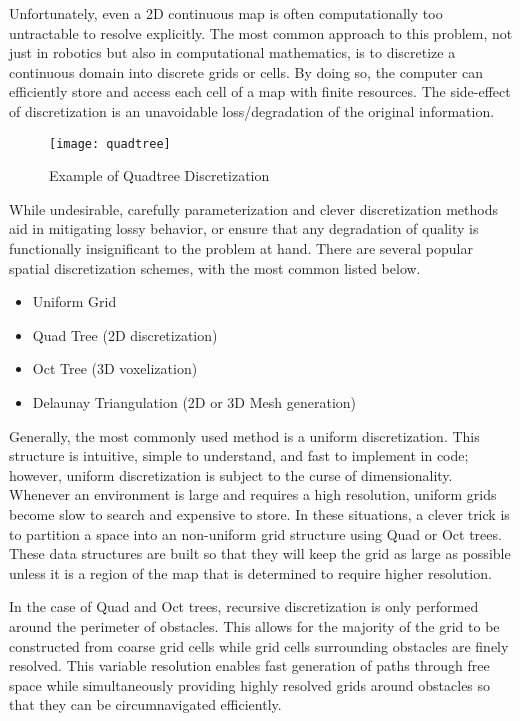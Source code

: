 Unfortunately, even a 2D continuous map is often computationally too untractable to resolve explicitly. The most common approach to this problem, not just in robotics but also in computational mathematics, is to discretize a continuous domain into discrete grids or cells. By doing so, the computer can efficiently store and access each cell of a map with finite resources. The side-effect of discretization is an unavoidable loss/degradation of the original information.

\begin{figure}[ht]
  \texttt{[image: quadtree]}
  \centering
  \label{fig:quadtree}
  \caption{Example of Quadtree Discretization}
\end{figure}

While undesirable, carefully parameterization and clever discretization methods aid in mitigating lossy behavior, or ensure that any degradation of quality is functionally insignificant to the problem at hand. There are several popular spatial discretization schemes, with the most common listed below. 

\begin{itemize}
  \item Uniform Grid
  \item Quad Tree (2D discretization)
  \item Oct Tree (3D voxelization)
  \item Delaunay Triangulation (2D or 3D Mesh generation)
\end{itemize}


Generally, the most commonly used method is a uniform discretization. This structure is intuitive, simple to understand, and fast to implement in code; however, uniform discretization is subject to the curse of dimensionality. Whenever an environment is large and requires a high resolution, uniform grids become slow to search and expensive to store. In these situations, a clever trick is to partition a space into an non-uniform grid structure using Quad or Oct trees. These data structures are built so that they will keep the grid as large as possible unless it is a region of the map that is determined to require higher resolution. 

In the case of Quad and Oct trees, recursive discretization is only performed around the perimeter of obstacles. This allows for the majority of the grid to be constructed from coarse grid cells while grid cells surrounding obstacles are finely resolved. This variable resolution enables fast generation of paths through free space while simultaneously providing highly resolved grids around obstacles so that they can be circumnavigated efficiently.

